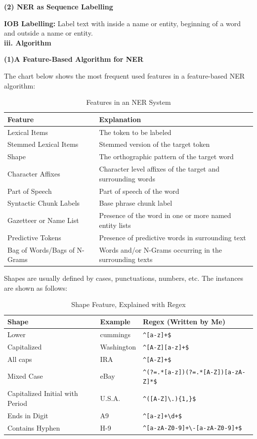 \documentclass[a4paper,12pt]{report}
\begin{document}
\noindent
\textbf{(2) NER as Sequence Labelling}

\noindent
\textbf{IOB Labelling:} Label text with inside a name or entity, beginning of a word and outside a name or entity.\\

\noindent 
\textbf{iii. Algorithm}

\noindent
\textbf{(1)A Feature-Based Algorithm for NER}

\noindent
The chart below shows the most frequent used features in a feature-based NER algorithm:
\begin{table}[h]
\begin{tabular}{l l}
\hline 
 \textbf{Feature} & \textbf{Explanation}  \\
 \hline 
 Lexical Items & The token to be labeled \\  
 Stemmed Lexical Items & Stemmed version of the target token\\
 Shape & The orthographic pattern of the target word	 \\
 Character Affixes & Character level affixes of the target and surrounding words  \\
 Part of Speech & Part of speech of the word \\
 Syntactic Chunk Labels & Base phrase chunk label\\
 Gazetteer or Name List & Presence of the word in one or more named entity lists\\
 Predictive Tokens & Presence of predictive words in surrounding text\\
 Bag of Words/Bags of N-Grams & Words and/or N-Grams occurring in the surrounding texts    
\end{tabular}
\caption{\label{tab:table-name}Features in an NER System}
\end{table}

\noindent
Shapes are usually defined by cases, punctuations, numbers, etc. The instances are shown as follows: 
\begin{table}[h]
\centering
\begin{tabular}{l | l | l} 
 \textbf{Shape} & \textbf{Example} & \textbf{Regex (Written by Me)}  \\
 \hline 
 Lower & cummings & \verb/^[a-z]+$/\\  
 Capitalized & Washington & \verb/^[A-Z][a-z]+$/\\
 All caps & IRA & \verb/^[A-Z]+$/ \\
 Mixed Case & eBay & \verb/^(?=.*[a-z])(?=.*[A-Z])[a-zA-Z]*$/\\
 Capitalized Initial with Period & U.S.A. & \verb/^([A-Z]\.){1,}$/\\
 Ends in Digit & A9 & \verb/^[a-z]+\d+$/\\
 Contains Hyphen & H-9 & \verb/^[a-zA-Z0-9]+\-[a-zA-Z0-9]+$/
\end{tabular}
\caption{\label{tab:table-name}Shape Feature, Explained with Regex}
\end{table}
\end{document}
